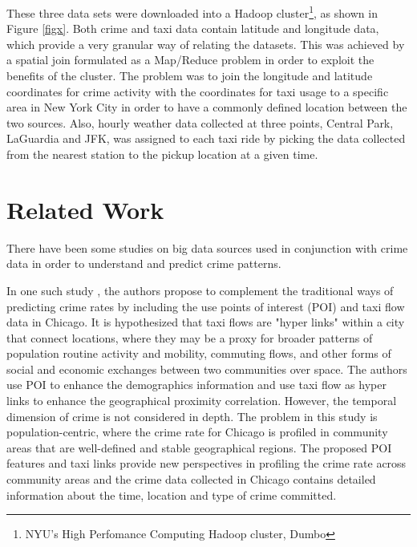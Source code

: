 \documentclass{sigkddExp}
\begin{document}
These three data sets were downloaded into a Hadoop cluster\footnote{NYU's High Perfomance Computing Hadoop cluster, Dumbo}, as shown in Figure \ref{figx}. Both crime and taxi data contain latitude and longitude data, which provide a very granular way of relating the datasets. 
This was achieved by a spatial join formulated as a Map/Reduce problem in order to exploit the benefits of the cluster. 
The problem was to join the longitude and latitude coordinates for crime activity with the coordinates for taxi usage to a specific area in New York City in order to have a commonly defined location between the two sources.
Also, hourly weather data collected at three points, Central Park, LaGuardia and JFK, was assigned to each taxi ride by picking the data collected from the nearest station to the pickup location at a given time. 



\section{Related Work}

There have been some studies on big data sources used in conjunction with crime data in order to understand and predict crime patterns. 

In one such study \cite{Wang16}, the authors propose to complement the traditional ways of predicting crime rates by including the use points of interest (POI) and taxi flow data in Chicago.  
It is hypothesized that taxi flows are "hyper links" within a city that connect locations, where they may be a proxy for broader patterns of population routine activity and mobility, commuting flows, and other forms of social and economic exchanges between two communities over space. The authors use POI to enhance the demographics information and use taxi flow as hyper links to enhance the geographical proximity correlation. However, the temporal dimension of crime is not considered in depth. The problem in this study is population-centric, where the crime rate for Chicago is profiled in community areas that are well-defined and stable geographical regions. The proposed POI features and taxi links provide new perspectives in profiling the crime rate across community areas and the crime data collected in Chicago contains detailed information about the time, location and type of crime committed.
\end{document}
